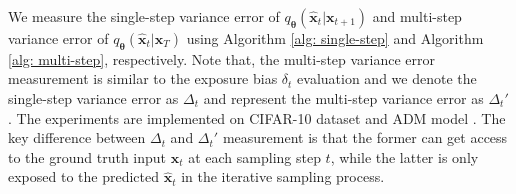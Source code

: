\documentclass{article} \usepackage{iclr2024_conference,times}
\begin{document}
We measure the single-step variance error of $q_{\pmb{\theta}}(\hat{\pmb{x}}_{t} | \pmb{x}_{t+1})$ and multi-step variance error of $q_{\pmb{\theta}}(\hat{\pmb{x}}_{t} | \pmb{x}_{T})$ using Algorithm \ref{alg: single-step} and Algorithm \ref{alg: multi-step}, respectively. Note that, the multi-step variance error measurement is similar to the exposure bias $\delta_t$ evaluation and we denote the single-step variance error as $\Delta_t$ and represent the multi-step variance error as $\Delta_t'$. The experiments are implemented on CIFAR-10 \citep{cifar10} dataset and ADM model \citep{ADM}. The key difference between $\Delta_t$ and $\Delta_t'$ measurement is that the former can get access to the ground truth input $\pmb{x}_t$ at each sampling step $t$, while the latter is only exposed to the predicted $\hat{\pmb{x}}_t$ in the iterative sampling process.
\end{document}
